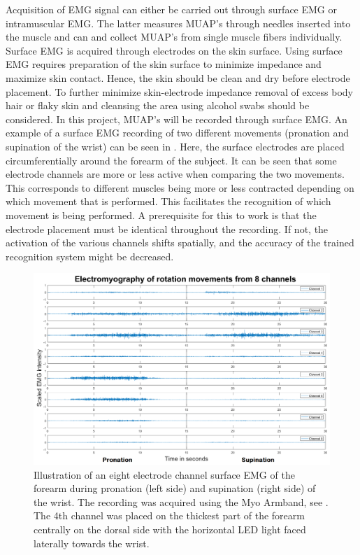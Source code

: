 Acquisition of EMG signal can either be carried out through surface EMG or intramuscular EMG. The latter measures MUAP's through needles inserted into the muscle and can and collect MUAP's from single muscle fibers individually. Surface EMG is acquired through electrodes on the skin surface. \cite{Cram2012}  Using surface EMG requires preparation of the skin surface to minimize impedance and maximize skin contact. Hence, the skin should be clean and dry before electrode placement. To further minimize skin-electrode impedance removal of excess body hair or flaky skin and cleansing the area using alcohol swabs should be considered. \cite{Turker2013,Cram2012} In this project, MUAP's will be recorded through surface EMG. An example of a surface EMG recording of two different movements (pronation and supination of the wrist) can be seen in . Here, the surface electrodes are placed circumferentially around the forearm of the subject. It can be seen that some electrode channels are more or less active when comparing the two movements. This corresponds to different muscles being more or less contracted depending on which movement that is performed. This facilitates the recognition of which movement is being performed. A prerequisite for this to work is that the electrode placement must be identical throughout the recording. If not, the activation of the various channels shifts spatially, and the accuracy of the trained recognition system might be decreased.

\begin{figure}[H]                 
	\includegraphics[width=1\textwidth]{figures/Emg_rot}  
	\caption{Illustration of an eight electrode channel surface EMG of the forearm during pronation (left side) and supination (right side) of the wrist. The recording was acquired using the Myo Armband, see . The 4th channel was placed on the thickest part of the forearm centrally on the dorsal side with the horizontal LED light faced laterally towards the wrist.}
	\label{fig:Emg_rot} 
\end{figure}

